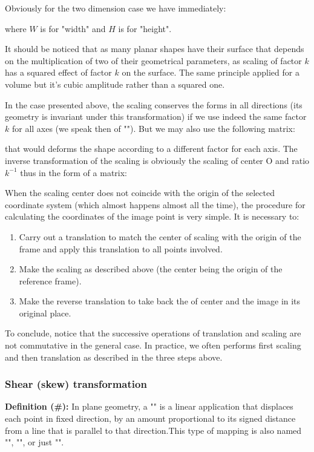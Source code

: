 	Obviously for the two dimension case we have immediately:
	
	where $W$ is for "width" and $H$ is for "height".
		
	\begin{tcolorbox}[title=Remark,colframe=black,arc=10pt]
	It  should be noticed that as many planar shapes have their surface that depends on the multiplication of two of their geometrical parameters, as scaling of factor $k$ has a squared effect of factor $k$ on the surface. The same principle applied for a volume but it's cubic amplitude rather than a squared one.
	\end{tcolorbox}
	In the case presented above, the scaling conserves the forms in all directions (its geometry is invariant under this transformation) if we use indeed the same factor $k$ for all axes (we speak then of ""). But we may also use the following matrix:
	
	that would deforms the shape according to a different factor for each axis.
	The inverse transformation of the scaling is obviously the scaling of center O and ratio $k^{-1}$ thus in the form of a matrix:
	
	When the scaling center does not coincide with the origin of the selected coordinate system (which almost happens almost all the time), the procedure for calculating the coordinates of the image point is very simple. It is necessary to:
	\begin{enumerate}
		\item Carry out a translation to match the center of scaling with the origin of the frame and apply this translation to all points involved.

		\item Make the scaling as described above (the center being the origin of the reference frame).

		\item Make the reverse translation to take back the of center and the image in its original place.
	\end{enumerate}
	To conclude, notice that the successive operations of translation and scaling are not commutative in the general case. In practice, we often performs first scaling and then translation as described in the three steps above.
	
	\subsubsection{Shear (skew) transformation}
	\textbf{Definition (\#\mydef):} In plane geometry, a "" is a linear application that displaces each point in fixed direction, by an amount proportional to its signed distance from a line that is parallel to that direction.This type of mapping is also named "", "", or just "".
	
